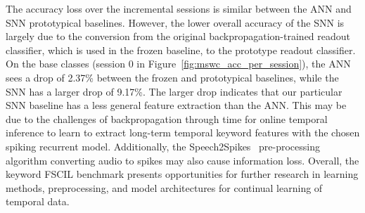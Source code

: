     The accuracy loss over the incremental sessions is similar between the ANN and SNN prototypical baselines. However, the lower overall accuracy of the SNN is largely due to the conversion from the original backpropagation-trained readout classifier, which is used in the frozen baseline, to the prototype readout classifier. 
    On the base classes (session 0 in Figure~\ref{fig:mswc_acc_per_session}), the ANN sees a drop of 2.37\% between the frozen and prototypical baselines, while the SNN has a larger drop of 9.17\%. 
    The larger drop indicates that our particular SNN baseline has a less general feature extraction than the ANN. This may be due to the challenges of backpropagation through time for online temporal inference to learn to extract long-term temporal keyword features with the chosen spiking recurrent model. Additionally, the Speech2Spikes~\cite{stewart23speech2spikes} pre-processing algorithm converting audio to spikes may also cause information loss. Overall, the keyword FSCIL benchmark presents opportunities for further research in learning methods, preprocessing, and model architectures for continual learning of temporal data. 





